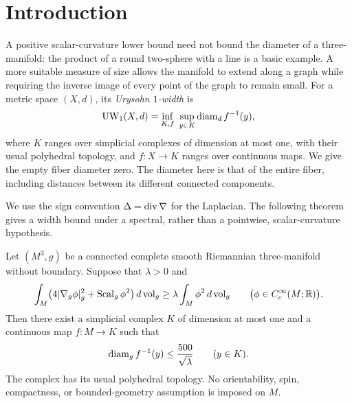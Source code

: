 \begin{abstract}
Every connected complete smooth Riemannian three-manifold without
boundary satisfying $-4\Delta+\Scal\ge\lambda>0$ as a quadratic-form
inequality admits a continuous map to a graph whose entire fibers have
diameter at most $500/\sqrt\lambda$ in the original metric.
No orientability, spin, compactness, or bounded-geometry assumption
is required.
\end{abstract}

\section{Introduction}\label{sec:introduction}

A positive scalar-curvature lower bound need not bound the diameter of a
three-manifold: the product of a round two-sphere with a line is a basic
example. A more suitable measure of size allows the manifold to extend
along a graph while requiring the inverse image of every point of the
graph to remain small. For a metric space $(X,d)$, its \emph{Urysohn
$1$-width} is
\[
 \operatorname{UW}_1(X,d)
 =\inf_{K,f}\ \sup_{y\in K}\operatorname{diam}_d f^{-1}(y),
\]
where $K$ ranges over simplicial complexes of dimension at most one, with
their usual polyhedral topology, and $f:X\to K$ ranges over continuous
maps. We give the empty fiber diameter zero. The diameter here is that of
the entire fiber, including distances between its different connected
components.

We use the sign convention $\Delta=\operatorname{div}\nabla$ for the Laplacian.
The following theorem gives a width bound under a spectral, rather than
a pointwise, scalar-curvature hypothesis.

\begin{theorem}\label{thm:main}
Let $(M^3,g)$ be a connected complete smooth Riemannian three-manifold
without boundary. Suppose that $\lambda>0$ and
\begin{equation}\label{eq:main-spectral}
 \int_M\bigl(4|\nabla_g\phi|_g^2+\operatorname{Scal}_g\phi^2\bigr)\,d\operatorname{vol}_g
 \ge \lambda\int_M\phi^2\,d\operatorname{vol}_g
 \qquad\bigl(\phi\in C_c^\infty(M;\mathbb R)\bigr).
\end{equation}
Then there exist a simplicial complex $K$ of dimension at most one and a
continuous map $f:M\to K$ such that
\[
 \operatorname{diam}_g f^{-1}(y)\le \frac{500}{\sqrt\lambda}
 \qquad(y\in K).
\]
The complex has its usual polyhedral topology. No orientability, spin,
compactness, or bounded-geometry assumption is imposed on $M$.
\end{theorem}


